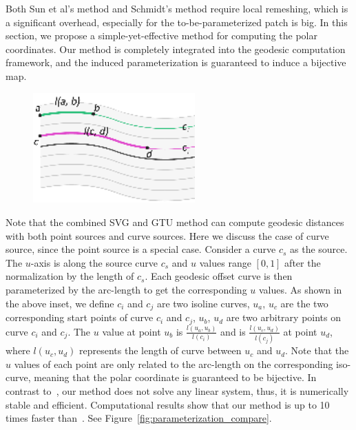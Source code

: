   Both Sun et al's method and Schmidt's method require local remeshing, which is a significant overhead, especially for the to-be-parameterized patch is big.
  In this section, we propose a simple-yet-effective method for computing the polar coordinates.
  Our method is completely integrated into the geodesic computation framework, and the induced parameterization is guaranteed to induce a bijective map.
  \begin{figure}
  \centering
  \includegraphics[width=2.45in]{figs/asd/para.png}
  \end{figure}
  Note that the combined SVG and GTU method can compute geodesic distances with both point sources and curve sources.
  Here we discuss the case of curve source, since the point source is a special case.
  Consider a curve ${c}_{s}$ as the source.
  The $u$-axis is along the source curve ${c}_{s}$ and $u$ values range $[0, 1]$ after the normalization by the length of ${c}_{s}$.
  Each geodesic offset curve is then parameterized by the arc-length to get the corresponding $u$ values.
  As shown in the above inset, we define ${c}_{i}$ and ${c}_{j}$ are two isoline curves,
  ${u}_{a}$, ${u}_{c}$ are the two corresponding start points of curve ${c}_{i}$ and ${c}_{j}$, ${u}_{b}$, ${u}_{d}$ are two arbitrary points on curve ${c}_{i}$ and ${c}_{j}$.
  The $u$ value at point ${u}_{b}$ is $\frac{l({u}_{a},{u}_{b})}{l({c}_{i})}$ and is $\frac{l({u}_{c},{u}_{d})}{l({c}_{j})}$ at point ${u}_{d}$,
  where $l({u}_{c},{u}_{d})$ represents the length of curve between ${u}_{c}$ and ${u}_{d}$.
  Note that the $u$ values of each point are only related to the arc-length on the corresponding iso-curve,
  meaning that the polar coordinate is guaranteed to be bijective.
  In contrast to~\cite{Sun:2013:TBI:2448196.2448221}, our method does not solve any linear system, thus, it is numerically stable and efficient.
  Computational results show that our method is up to 10 times faster than~\cite{Sun:2013:TBI:2448196.2448221}.
  See Figure~\ref{fig:parameterization_compare}.
